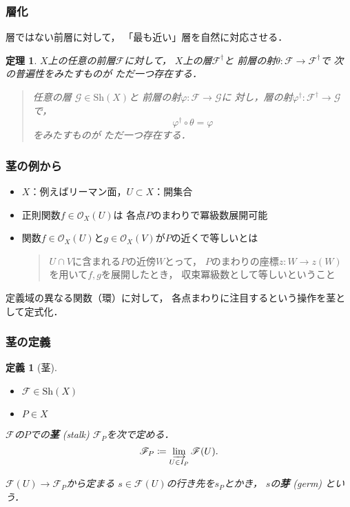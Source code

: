 \documentclass[dvipdfmx,12pt,aspectratio=169,leqno]{beamer}%
\newcommand{\mcal}{\mathcal}
\numberwithin{equation}{subsection}
\newcommand{\OO}{\mcal{O}}
\newcommand{\Sh}{\mathrm{Sh}}
\theoremstyle{mystyle}
\newtheorem{DFN}[AXM]{定義}
\newtheorem{THM}[AXM]{定理}
\begin{document}
\begin{frame}
    \frametitle{層化}
    層ではない前層に対して，
    「最も近い」層を自然に対応させる．
    \begin{THM}\label{thm:sheafification}
        \(X\)上の任意の前層\(\mathscr{F}\)に対して，
        \(X\)上の層\(\mathscr{F}^\dagger\)と
        前層の射\(\theta\colon \mathscr{F}\to\mathscr{F}^\dagger\)で
        次の普遍性をみたすものが
        ただ一つ存在する．
        \begin{quote}
            任意の層 \(\mathcal{G}\in\Sh(X)\)と
            前層の射\(\varphi\colon \mathscr{F}\to\mathscr{G}\)に
            対し，層の射\(\varphi^\dagger\colon\mathscr{F}^\dagger
            \to\mathscr{G}\)で，
            \[\varphi^\dagger\circ \theta=\varphi\]をみたすものが
            ただ一つ存在する．
        \end{quote}
    \end{THM}    
\end{frame}

\begin{frame}
    \frametitle{茎の例から}
    \begin{itemize}
        \item \(X\)：例えばリーマン面，\(U\subset X\)：開集合
        \item 正則関数\(f\in\OO_{X}(U)\)は
        各点\(P\)のまわりで冪級数展開可能
        \item 関数\(f\in \mathscr{O}_X(U)\)と\(g\in \mathscr{O}_X(V)\)が\(P\)の近くで等しいとは
        
        \begin{quote}
            \(U\cap V\)に含まれる\(P\)の近傍\(W\)とって，
            \(P\)のまわりの座標\(z\colon W\to z(W)\)
            を用いて\(f,g\)を展開したとき，
            収束冪級数として等しいということ
        \end{quote}
    \end{itemize}

定義域の異なる関数（環）に対して，
各点まわりに注目するという操作を茎として定式化．

\end{frame}

\begin{frame}
    \frametitle{茎の定義}
    \begin{DFN}[茎]
        \begin{itemize}
            \item \(\mathscr{F}\in\Sh(X)\)
            \item \(P\in X\)
        \end{itemize}
        \(\mathscr{F}\)の\(P\)での\textbf{茎} (stalk) \(
            \mathscr{F}_P
        \)を次で定める．
        \[
            \mathscr{F}_P\coloneqq
            \varinjlim_{U\in I_P}\mathscr{F}(U).
        \]
    
        \(\mathscr{F}(U)\to\mathscr{F}_P\)から定まる
        \(s\in\mathscr{F}(U)\)の行き先を\(s_P\)とかき，
        \(s\)の\textbf{芽} (germ) という．
    \end{DFN}
\end{frame}
\end{document}
